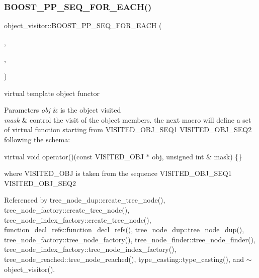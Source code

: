 \subsubsection{\texorpdfstring{B\+O\+O\+S\+T\+\_\+\+P\+P\+\_\+\+S\+E\+Q\+\_\+\+F\+O\+R\+\_\+\+E\+A\+C\+H()}{BOOST\_PP\_SEQ\_FOR\_EACH()}\hspace{0.1cm}{\footnotesize\ttfamily [1/2]}}
{\footnotesize\ttfamily object\+\_\+visitor\+::\+B\+O\+O\+S\+T\+\_\+\+P\+P\+\_\+\+S\+E\+Q\+\_\+\+F\+O\+R\+\_\+\+E\+A\+CH (\begin{DoxyParamCaption}\item[{\hyperlink{visitor_8hpp_a824d794626a77855112081a5d90bd4bd}{O\+P\+E\+R\+A\+T\+O\+R\+\_\+\+M\+A\+C\+RO}}]{,  }\item[{B\+O\+O\+S\+T\+\_\+\+P\+P\+\_\+\+E\+M\+P\+TY}]{,  }\item[{\hyperlink{tree__node_8hpp_aabebe0f1b0926f2961275b6b0e7b0fff}{V\+I\+S\+I\+T\+E\+D\+\_\+\+O\+B\+J\+\_\+\+S\+E\+Q1}}]{ }\end{DoxyParamCaption})}



virtual template object functor 


\begin{DoxyParams}{Parameters}
{\em obj} & is the object visited \\
\hline
{\em mask} & control the visit of the object members. the next macro will define a set of virtual function starting from V\+I\+S\+I\+T\+E\+D\+\_\+\+O\+B\+J\+\_\+\+S\+E\+Q1 V\+I\+S\+I\+T\+E\+D\+\_\+\+O\+B\+J\+\_\+\+S\+E\+Q2 following the schema\+:\\
\hline
\end{DoxyParams}
virtual void operator()(const V\+I\+S\+I\+T\+E\+D\+\_\+\+O\+B\+J $\ast$ obj, unsigned int \& mask) \{\}

where V\+I\+S\+I\+T\+E\+D\+\_\+\+O\+BJ is taken from the sequence V\+I\+S\+I\+T\+E\+D\+\_\+\+O\+B\+J\+\_\+\+S\+E\+Q1 V\+I\+S\+I\+T\+E\+D\+\_\+\+O\+B\+J\+\_\+\+S\+E\+Q2 

Referenced by tree\+\_\+node\+\_\+dup\+::create\+\_\+tree\+\_\+node(), tree\+\_\+node\+\_\+factory\+::create\+\_\+tree\+\_\+node(), tree\+\_\+node\+\_\+index\+\_\+factory\+::create\+\_\+tree\+\_\+node(), function\+\_\+decl\+\_\+refs\+::function\+\_\+decl\+\_\+refs(), tree\+\_\+node\+\_\+dup\+::tree\+\_\+node\+\_\+dup(), tree\+\_\+node\+\_\+factory\+::tree\+\_\+node\+\_\+factory(), tree\+\_\+node\+\_\+finder\+::tree\+\_\+node\+\_\+finder(), tree\+\_\+node\+\_\+index\+\_\+factory\+::tree\+\_\+node\+\_\+index\+\_\+factory(), tree\+\_\+node\+\_\+reached\+::tree\+\_\+node\+\_\+reached(), type\+\_\+casting\+::type\+\_\+casting(), and $\sim$object\+\_\+visitor().

